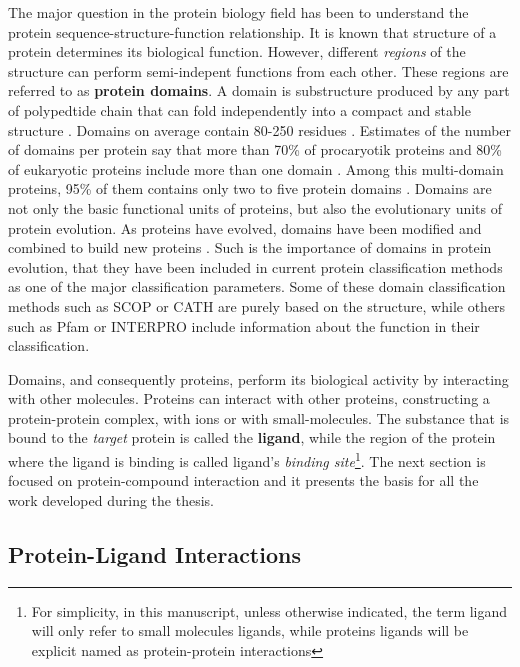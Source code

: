 \documentclass[12pt, a4paper,twoside]{tesi_upf}
\begin{document}
\par The major question in the protein biology field has been to understand the protein sequence-structure-function relationship. It is known that structure of a protein determines its biological function. However, different \textit{regions} of the structure can perform semi-indepent functions from each other. These regions are referred to as \textbf{protein domains}. A domain is substructure produced by any part of polypedtide chain that can fold independently into a compact and stable structure \cite{Richardson1981, That1991, DomainDef}. Domains on average contain 80-250 residues \cite{Islam1995}. Estimates of the number of domains per protein say that more than 70\% of procaryotik proteins and 80\% of eukaryotic proteins include more than one domain \cite{Han2007, Chothia2003}. Among this multi-domain proteins, 95\% of them contains only two to five protein domains \cite{Han2007}.  Domains are not only the basic functional units of proteins, but also the evolutionary units of protein evolution. As proteins have evolved, domains have been modified and combined to build new proteins \cite{Vogel2004, Apic2001}. 
Such is the importance  of domains in protein evolution, that they have been included in current protein classification methods as one of the major classification parameters. Some of these domain classification methods such as SCOP \cite{Murzin1995} or CATH \cite{Orengo1997} are purely based on the structure, while others such as Pfam \cite{Bateman2002} or INTERPRO \cite{Hunter2009} include information about the function in their classification. 
\par Domains, and consequently proteins, perform its biological activity by interacting with other molecules. Proteins can interact with other proteins, constructing a protein-protein complex, with ions or with small-molecules. The substance that is bound to the \textit{target} protein is called the \textbf{ligand}, while the region of the protein where the ligand is binding is called ligand's \textit{binding site}\footnote{For simplicity, in this manuscript, unless otherwise indicated, the term ligand will only refer to small molecules ligands, while proteins ligands will be explicit named as protein-protein interactions}. The next section is focused on protein-compound interaction and it presents the basis for all the work developed during the thesis. 



\subsection{Protein-Ligand Interactions} \label{ligand_intect}
\end{document}
